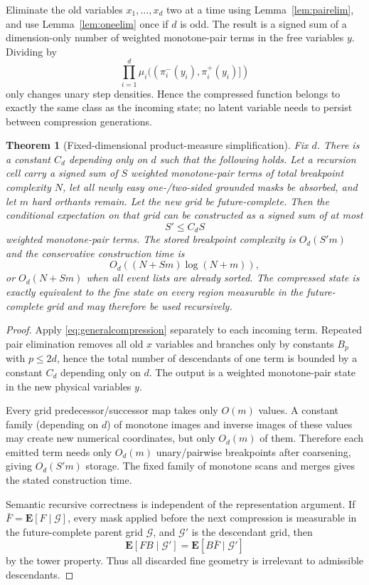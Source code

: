 \documentclass[12pt,a4paper]{article}
\newtheorem{theorem}{Theorem}
\theoremstyle{definition}
\newcommand{\1}{\mathbf 1}
\begin{document}
Eliminate the old variables $x_1,\ldots,x_d$ two at a time using Lemma~\ref{lem:pairelim}, and use Lemma~\ref{lem:oneelim} once if $d$ is odd.  The result is a signed sum of a dimension-only number of weighted monotone-pair terms in the free variables $y$.  Dividing by
\[
\prod_{i=1}^d \mu_i((\pi_i^-(y_i),\pi_i^+(y_i)])
\]
only changes unary step densities.  Hence the compressed function belongs to exactly the same class as the incoming state; no latent variable needs to persist between compression generations.

\begin{theorem}[Fixed-dimensional product-measure simplification] \label{thm:generalsimplification}
Fix $d$.  There is a constant $C_d$ depending only on $d$ such that the following holds.  Let a recursion cell carry a signed sum of $S$ weighted monotone-pair terms of total breakpoint complexity $N$, let all newly easy one-/two-sided grounded masks be absorbed, and let $m$ hard orthants remain.  Let the new grid be future-complete.  Then the conditional expectation on that grid can be constructed as a signed sum of at most
\[
S'\le C_dS
\]
weighted monotone-pair terms.  The stored breakpoint complexity is $O_d(S'm)$ and the conservative construction time is
\[
O_d\!\left((N+Sm)\log(N+m)\right),
\]
or $O_d(N+Sm)$ when all event lists are already sorted.  The compressed state is exactly equivalent to the fine state on every region measurable in the future-complete grid and may therefore be used recursively.
\end{theorem}

\begin{proof}
Apply \eqref{eq:generalcompression} separately to each incoming term.  Repeated pair elimination removes all old $x$ variables and branches only by constants $B_p$ with $p\le2d$, hence the total number of descendants of one term is bounded by a constant $C_d$ depending only on $d$.  The output is a weighted monotone-pair state in the new physical variables $y$.

Every grid predecessor/successor map takes only $O(m)$ values.  A constant family (depending on $d$) of monotone images and inverse images of these values may create new numerical coordinates, but only $O_d(m)$ of them.  Therefore each emitted term needs only $O_d(m)$ unary/pairwise breakpoints after coarsening, giving $O_d(S'm)$ storage.  The fixed family of monotone scans and merges gives the stated construction time.

Semantic recursive correctness is independent of the representation argument.  If $\bar F=\mathbf E[F\mid\mathcal G]$, every mask applied before the next compression is measurable in the future-complete parent grid $\mathcal G$, and $\mathcal G'$ is the descendant grid, then
\[
\mathbf E[FB\mid\mathcal G']=\mathbf E[B\bar F\mid\mathcal G']
\]
by the tower property.  Thus all discarded fine geometry is irrelevant to admissible descendants.
\end{proof}
\end{document}
